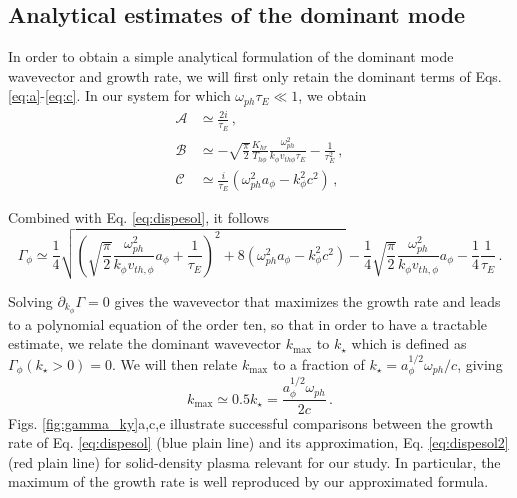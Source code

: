 \documentclass[aps,showpacs,superscriptaddress]{revtex4}
\begin{document}
\subsection{Analytical estimates of the dominant mode}

In order to obtain a simple analytical formulation of the dominant mode wavevector and growth rate, we will first only retain the dominant terms of Eqs. \eqref{eq:a}-\eqref{eq:c}. In our system for which $\omega_{ph} \tau_E \ll 1$, we obtain
\begin{align}
\mathcal{A} & \simeq \frac{2i}{\tau_E}  \label{eq:a2} \, , \\
\mathcal{B} & \simeq    - \sqrt{\frac{\pi}{2}}\frac{K_{hr} }{T_{h\phi}}\frac{\omega_{ph}^2}{k_\phi v_{th\phi} \tau_E}
 -\frac{1}{\tau_E^2 }  \, , \label{eq:b2} \\
\mathcal{C} & \simeq \frac{i}{\tau_E}(\omega_{ph}^2 a_\phi -k_\phi^2c^2 )\label{eq:c2}\, , 
\end{align}

Combined with Eq. \eqref{eq:dispesol}, it follows
\begin{equation}
\Gamma_\phi  \simeq \frac{1}{4}  \sqrt{ \left( \sqrt{\frac{\pi}{2}} \frac{\omega_{ph}^2}{k_\phi v_{th,\phi}}a_\phi    + \frac{1}{\tau_E} \right)^2 +  8(\omega_{ph}^2 a_\phi  - k_\phi^2 c^2 )   }  -\frac{1}{4}   \sqrt{\frac{\pi}{2}} \frac{\omega_{ph}^2}{k_\phi v_{th,\phi}}a_\phi    -\frac{1}{4}   \frac{1}{\tau_E}
\label{eq:dispesol2}\, .
\end{equation}

 Solving $\partial_{k_\phi} \Gamma = 0 $ gives the wavevector that maximizes the growth rate and leads to a polynomial equation of the order ten, so that in order to have a tractable estimate, we relate the dominant wavevector $k_\mathrm{max}$ to $k_\star$ which is defined as $\Gamma_\phi (k_\star>0)=0$. We will then relate $k_\mathrm{max}$ to a fraction of $k_\star =  a_\phi^{1/2}\omega_{ph}/c$, giving 
\begin{equation}\label{eq:ksat}
k_\mathrm{max} \simeq 0.5 k_\star = \frac{a_\phi^{1/2}\omega_{ph}}{2c} \, .
\end{equation}
Figs. \ref{fig:gamma_ky}a,c,e  illustrate successful comparisons between the growth rate of Eq. \eqref{eq:dispesol} (blue plain line) and its approximation, Eq. \eqref{eq:dispesol2}  (red plain line) for  solid-density plasma relevant for our study. In particular, the maximum of the growth rate is well reproduced by our approximated formula.
\end{document}
